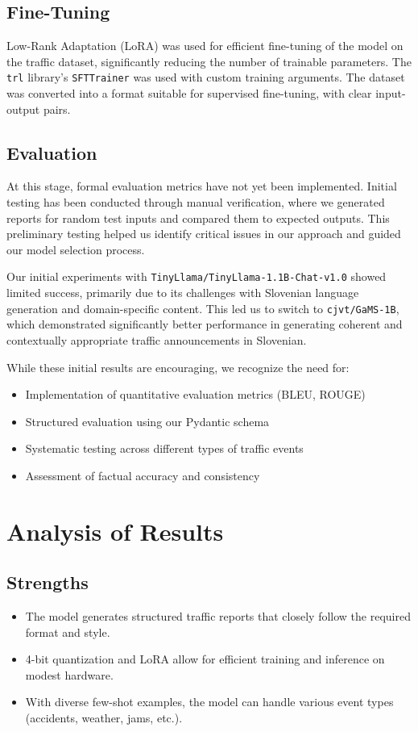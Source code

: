 \documentclass[fleqn,moreauthors,10pt]{ds_report}
\begin{document}
\subsection*{Fine-Tuning}
Low-Rank Adaptation (LoRA) was used for efficient fine-tuning of the model on the traffic dataset, significantly reducing the number of trainable parameters. The \texttt{trl} library’s \texttt{SFTTrainer} was used with custom training arguments. The dataset was converted into a format suitable for supervised fine-tuning, with clear input-output pairs.

\subsection*{Evaluation}
At this stage, formal evaluation metrics have not yet been implemented. Initial testing has been conducted through manual verification, where we generated reports for random test inputs and compared them to expected outputs. This preliminary testing helped us identify critical issues in our approach and guided our model selection process.

Our initial experiments with \texttt{TinyLlama/TinyLlama-1.1B-Chat-v1.0} showed limited success, primarily due to its challenges with Slovenian language generation and domain-specific content. This led us to switch to \texttt{cjvt/GaMS-1B}, which demonstrated significantly better performance in generating coherent and contextually appropriate traffic announcements in Slovenian.

While these initial results are encouraging, we recognize the need for:
\begin{itemize}
    \item Implementation of quantitative evaluation metrics (BLEU, ROUGE)
    \item Structured evaluation using our Pydantic schema
    \item Systematic testing across different types of traffic events
    \item Assessment of factual accuracy and consistency
\end{itemize}


\section*{Analysis of Results}

\subsection*{Strengths}
\begin{itemize}
    \item The model generates structured traffic reports that closely follow the required format and style.
    \item 4-bit quantization and LoRA allow for efficient training and inference on modest hardware.
    \item With diverse few-shot examples, the model can handle various event types (accidents, weather, jams, etc.).
\end{itemize}
\end{document}
